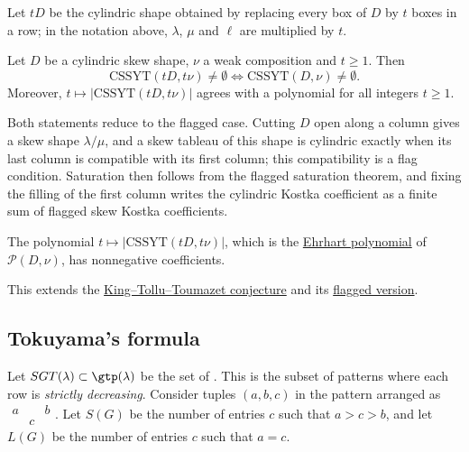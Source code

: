 Let $tD$ be the cylindric shape obtained by replacing every box of $D$ by $t$
boxes in a row; in the notation above, $\lambda$, $\mu$ and $\ell$ are
multiplied by $t$.

\begin{theorem}
\label{cylindricKostkaSaturation}
Let $D$ be a cylindric skew shape, $\nu$ a weak composition and $t \geq 1$.
Then
\[
\mathrm{CSSYT}(tD,t\nu) \neq \emptyset \iff \mathrm{CSSYT}(D,\nu) \neq \emptyset.
\]
Moreover, $t \mapsto |\mathrm{CSSYT}(tD,t\nu)|$ agrees with a polynomial for
all integers $t \geq 1$.
\end{theorem}

Both statements reduce to the flagged case.  Cutting $D$ open along a column
gives a skew shape $\lambda/\mu$, and a skew tableau of this shape is
cylindric exactly when its last column is compatible with its first column;
this compatibility is a flag condition.  Saturation then follows from the
flagged saturation theorem, and fixing the filling of the first column writes
the cylindric Kostka coefficient as a finite sum of flagged skew Kostka
coefficients.

\begin{conjecture}
\label{cylindricKostkaEhrhartConjecture}
The polynomial $t \mapsto |\mathrm{CSSYT}(tD,t\nu)|$, which is the
\hyperref[ehrhart]{Ehrhart polynomial} of $\mathcal{P}(D,\nu)$, has nonnegative
coefficients.
\end{conjecture}
This extends the \hyperref[gtKostkaEhrhart]{King--Tollu--Toumazet conjecture}
and its \hyperref[flaggedSchurKostkaConjecture]{flagged version}.


\subsection[gtpatternsTokuyama]{Tokuyama's formula}

Let $SGT(\lambda)\subset \gtp(\lambda)$ be the set of
\label{strictGTPattern}.
This is the subset of patterns where each row is \emph{strictly decreasing}.
Consider tuples $(a,b,c)$ in the pattern arranged as
$\begin{smallmatrix}
a && b\\ & c \end{smallmatrix}$.
Let $S(G)$ be the number of entries $c$ such that $a\gt c \gt b$,
and let $L(G)$ be the number of entries $c$ such that $a=c$.

